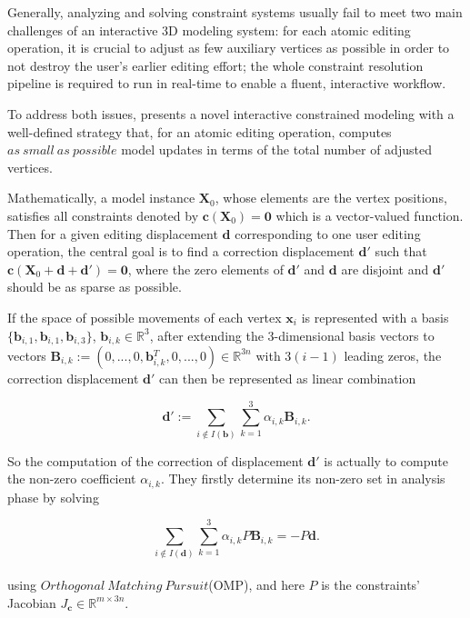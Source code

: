 Generally, analyzing and solving constraint systems usually fail to meet two main challenges of an interactive 3D modeling system: for each atomic editing operation,
it is crucial to adjust as few auxiliary vertices as possible in order to not destroy the user's earlier editing effort;
the whole constraint resolution pipeline is required to run in real-time to enable a fluent, interactive workflow.

To address both issues, \cite{habbecke2012linear} presents a novel interactive constrained modeling with a well-defined strategy that, for an atomic editing operation, computes $as~small~as~possible$ model updates in terms of the total number of adjusted vertices.

Mathematically, a model instance $\mathbf{X}_0$, whose elements are the vertex positions, satisfies all constraints denoted by $\mathbf{c}(\mathbf{X}_0)=\mathbf{0}$ which is a vector-valued function. Then for a given editing displacement $\mathbf{d}$ corresponding to one user editing operation, the central goal is to find a correction displacement $\mathbf{d'}$  such that $\mathbf{c}(\mathbf{X}_0+\mathbf{d}+\mathbf{d'})=\mathbf{0}$, where the zero elements of $\mathbf{d'}$ and $\mathbf{d}$ are disjoint and $\mathbf{d'}$ should be as sparse as possible.

If the space of possible movements of each vertex $\mathbf{x}_{i}$ is represented with a basis $\{\mathbf{b}_{i,1},\mathbf{b}_{i,1},\mathbf{b}_{i,3}\}$, $\mathbf{b}_{i,k} \in \mathbb{R}^3$, after extending the 3-dimensional basis vectors to vectors $\mathbf{B}_{i,k}:=(0,...,0,\mathbf{b}{_{i,k}^{T}},0,...,0) \in \mathbb{R}^{3n}$ with $3(i-1)$ leading zeros, the correction displacement $\mathbf{d'}$ can then be represented as linear combination

\small{
\begin{equation}
 \label{eq:ConstrainedModeling1}
 \mathbf{d'} := \sum_{i\notin I(\mathbf{b})}^{}\sum_{k=1}^{3}\alpha_{i,k}\mathbf{B}_{i,k}.
\end{equation}
}

So the computation of the correction of displacement $\mathbf{d'}$ is actually to compute the non-zero coefficient $\alpha_{i,k}$.
They firstly determine its non-zero set in analysis phase by solving

\small{
\begin{equation}
 \label{eq:ConstrainedModeling2}
 \sum_{i\notin I(\mathbf{d})}^{}\sum_{k=1}^{3}\alpha_{i,k}P\mathbf{B}_{i,k}=-P\mathbf{d}.
\end{equation}
}
\\
using $Orthogonal~Matching~Pursuit$(OMP),%
and here $P$ is the constraints' Jacobian $J_{\mathbf{c}}\in \mathbb{R}^{m\times 3n}$.


